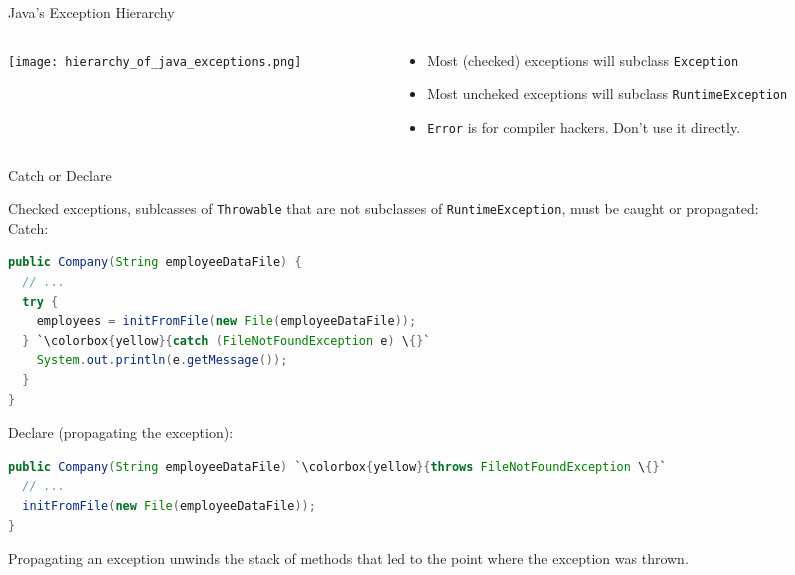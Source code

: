 \documentclass{beamer}
\begin{document}
\begin{frame}[fragile]{Java's Exception Hierarchy}

\begin{columns}[t]
\begin{column}{2in}
\begin{center}
\texttt{[image: hierarchy\_of\_java\_exceptions.png]}
\end{center}
\end{column}
\begin{column}{3in}
\begin{itemize}
\item Most (checked) exceptions will subclass {\tt Exception}
\item Most uncheked exceptions will subclass {\tt RuntimeException}
\item {\tt Error} is for compiler hackers.  Don't use it directly.
\end{itemize}
\end{column}
\end{columns}

\end{frame}


\begin{frame}[fragile]{Catch or Declare}

\vspace{-.05in}
Checked exceptions, sublcasses of {\tt Throwable} that are not subclasses of {\tt RuntimeException}, must be caught or propagated:\\
\vspace{.05in}
Catch:
\vspace{-.05in}
\begin{lstlisting}[language=Java,escapechar=`]
public Company(String employeeDataFile) {
  // ...
  try {
    employees = initFromFile(new File(employeeDataFile));
  } `\colorbox{yellow}{catch (FileNotFoundException e) \{}`
    System.out.println(e.getMessage());
  }
}
\end{lstlisting}
\vspace{-.05in}
Declare (propagating the exception):
\vspace{-.05in}
\begin{lstlisting}[language=Java,escapechar=`]
public Company(String employeeDataFile) `\colorbox{yellow}{throws FileNotFoundException \{}`
  // ...
  initFromFile(new File(employeeDataFile));
}
\end{lstlisting}
\vspace{-.05in}
Propagating an exception unwinds the stack of methods that led to the point where the exception was thrown.
\end{frame}
\end{document}
